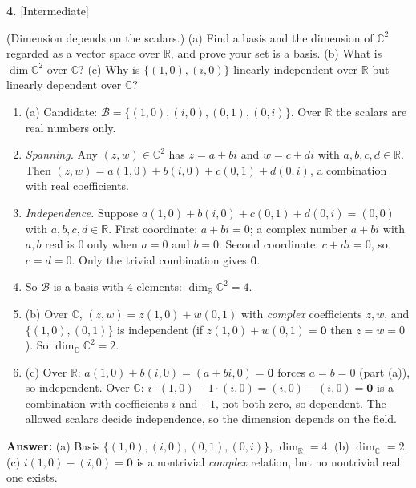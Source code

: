 \documentclass[11pt]{article}
\begin{document}
\par\vspace{2pt}
\begin{minipage}{\linewidth}\textbf{4.} \hfill{\scriptsize\color{ink}[Intermediate]}\par\nopagebreak (Dimension depends on the scalars.) (a) Find a basis and the dimension of $\mathbb{C}^{2}$ regarded as a vector space over $\mathbb{R}$, and prove your set is a basis. (b) What is $\dim\mathbb{C}^{2}$ over $\mathbb{C}$? (c) Why is $\{(1,0),(i,0)\}$ linearly independent over $\mathbb{R}$ but linearly dependent over $\mathbb{C}$?
\end{minipage}\par\nopagebreak
\begin{tcolorbox}[breakable,colback=ans,colframe=ansb,boxrule=0.5pt,left=4pt,right=4pt,top=2pt,bottom=2pt]\begin{enumerate}[leftmargin=3.1em,itemsep=1pt,topsep=1pt,label=\textbf{Step \arabic*.}]\item (a) Candidate: $\mathcal B=\{(1,0),(i,0),(0,1),(0,i)\}$. Over $\mathbb{R}$ the scalars are real numbers only.
\item \emph{Spanning.} Any $(z,w)\in\mathbb{C}^{2}$ has $z=a+bi$ and $w=c+di$ with $a,b,c,d\in\mathbb{R}$. Then $(z,w)=a(1,0)+b(i,0)+c(0,1)+d(0,i)$, a combination with real coefficients.
\item \emph{Independence.} Suppose $a(1,0)+b(i,0)+c(0,1)+d(0,i)=(0,0)$ with $a,b,c,d\in\mathbb{R}$. First coordinate: $a+bi=0$; a complex number $a+bi$ with $a,b$ real is $0$ only when $a=0$ and $b=0$. Second coordinate: $c+di=0$, so $c=d=0$. Only the trivial combination gives $\mathbf 0$.
\item So $\mathcal B$ is a basis with $4$ elements: $\dim_{\mathbb{R}}\mathbb{C}^{2}=4$.
\item (b) Over $\mathbb{C}$, $(z,w)=z(1,0)+w(0,1)$ with \emph{complex} coefficients $z,w$, and $\{(1,0),(0,1)\}$ is independent (if $z(1,0)+w(0,1)=\mathbf 0$ then $z=w=0$). So $\dim_{\mathbb{C}}\mathbb{C}^{2}=2$.
\item (c) Over $\mathbb{R}$: $a(1,0)+b(i,0)=(a+bi,0)=\mathbf 0$ forces $a=b=0$ (part (a)), so independent. Over $\mathbb{C}$: $i\cdot(1,0)-1\cdot(i,0)=(i,0)-(i,0)=\mathbf 0$ is a combination with coefficients $i$ and $-1$, not both zero, so dependent. The allowed scalars decide independence, so the dimension depends on the field.
\end{enumerate}\textbf{Answer:} (a) Basis $\{(1,0),(i,0),(0,1),(0,i)\}$, $\dim_{\mathbb{R}}=4$. (b) $\dim_{\mathbb{C}}=2$. (c) $i(1,0)-(i,0)=\mathbf 0$ is a nontrivial \emph{complex} relation, but no nontrivial real one exists.\end{tcolorbox}
\end{document}
